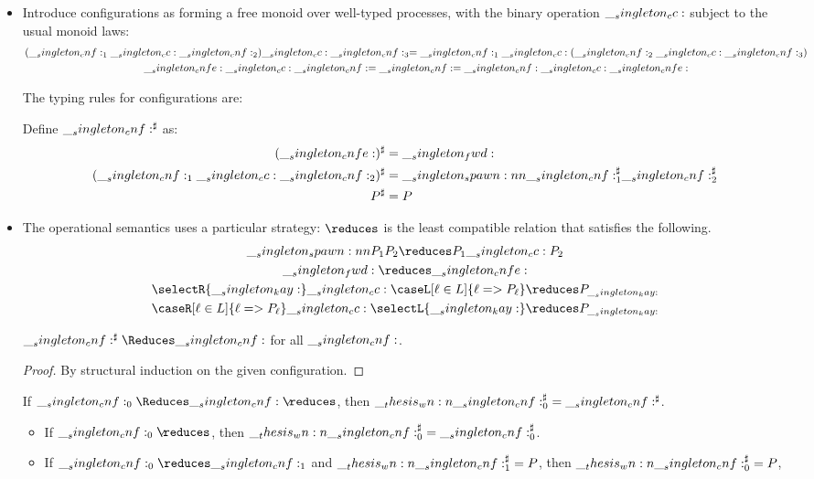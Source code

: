 \begin{itemize}
\item Introduce configurations as forming a free monoid over well-typed processes, with the binary operation $\__singleton_cc:$ subject to the usual monoid laws:
  \begin{gather*}
    (\__singleton_cnf:_1 \__singleton_cc: \__singleton_cnf:_2) \__singleton_cc: \__singleton_cnf:_3 = \__singleton_cnf:_1 \__singleton_cc: (\__singleton_cnf:_2 \__singleton_cc: \__singleton_cnf:_3) \\
    \__singleton_cnfe: \__singleton_cc: \__singleton_cnf: = \__singleton_cnf: = \__singleton_cnf: \__singleton_cc: \__singleton_cnfe:
  \end{gather*}

  The typing rules for configurations are:

  Define $\__singleton_cnf:^\sharp$ as:
  \begin{align*}
    (\__singleton_cnfe:)^\sharp &= \__singleton_fwd: \\
    (\__singleton_cnf:_1 \__singleton_cc: \__singleton_cnf:_2)^\sharp &= \__singleton_spawn:nn {\__singleton_cnf:_1^\sharp} {\__singleton_cnf:_2^\sharp} \\
    P^\sharp &= P
  \end{align*}



\item The operational semantics uses a particular strategy: $\reduces$ is the least compatible relation that satisfies the following.
  \begin{gather*}
    \spawn{P_1}{P_2} \reduces P_1 \cc P_2 \\
    \fwd \reduces \cnfe \\
    \selectR{\kay} \cc \caseL[\ell \in L]{\ell => P_{\ell}} \reduces P_{\kay} \\
    \caseR[\ell \in L]{\ell => P_{\ell}} \cc \selectL{\kay} \reduces P_{\kay}
  \end{gather*}

  \begin{theorem}
    $\cnf^\sharp \Reduces \cnf$ for all $\__singleton_cnf:$.
  \end{theorem}
  \begin{proof}
    By structural induction on the given configuration.
  \end{proof}

  \begin{conjecture}
    If $\cnf_0 \Reduces \cnf \longarrownot\reduces$, then $\__thesis_wn:n {\__singleton_cnf:_0^\sharp} = \__singleton_cnf:^\sharp$.
    \begin{itemize}
    \item If $\cnf_0 \longarrownot\reduces$, then $\__thesis_wn:n {\__singleton_cnf:_0^\sharp} = \__singleton_cnf:_0^\sharp$.
    \item If $\cnf_0 \reduces \cnf_1$ and $\__thesis_wn:n {\__singleton_cnf:_1^\sharp} = P$, then $\__thesis_wn:n {\__singleton_cnf:_0^\sharp} = P$, 
    \end{itemize}
  \end{conjecture}


\end{itemize}
